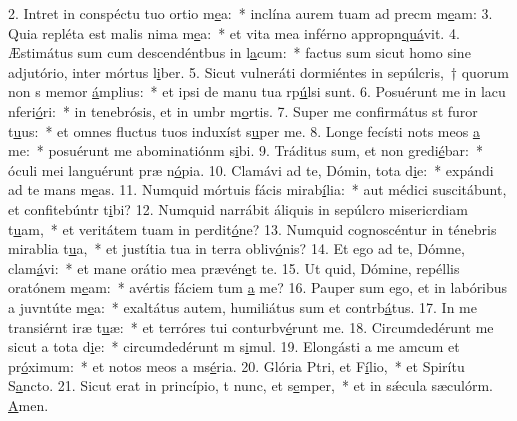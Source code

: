 2. Intret in conspéctu tuo ortio m\uline{e}a:~* inclína aurem tuam ad precm m\uline{e}am:
3. Quia repléta est malis nima m\uline{e}a:~* et vita mea inférno appropn\uline{quá}vit.
4. Æstimátus sum cum descendéntbus in l\uline{a}cum:~* factus sum sicut homo sine adjutório, inter mórtus l\uline{i}ber.
5. Sicut vulneráti dormiéntes in sepúlcris,~† quorum non s memor \uline{á}mplius:~* et ipsi de manu tua rp\uline{ú}lsi sunt.
6. Posuérunt me in lacu nferi\uline{ó}ri:~* in tenebrósis, et in umbr m\uline{o}rtis.
7. Super me confirmátus st furor t\uline{u}us:~* et omnes fluctus tuos induxíst s\uline{u}per me.
8. Longe fecísti nots meos \uline{a} me:~* posuérunt me abominatiónm s\uline{i}bi.
9. Tráditus sum, et non gredi\uline{é}bar:~* óculi mei languérunt præ n\uline{ó}pia.
10. Clamávi ad te, Dómin, tota d\uline{i}e:~* expándi ad te mans m\uline{e}as.
11. Numquid mórtuis fácis mirab\uline{í}lia:~* aut médici suscitábunt, et confitebúntr t\uline{i}bi?
12. Numquid narrábit áliquis in sepúlcro misericrdiam t\uline{u}am,~* et veritátem tuam in perdit\uline{ó}ne?
13. Numquid cognoscéntur in ténebris mirablia t\uline{u}a,~* et justítia tua in terra obliv\uline{ó}nis?
14. Et ego ad te, Dómne, clam\uline{á}vi:~* et mane orátio mea prævén\uline{e}t te.
15. Ut quid, Dómine, repéllis oratónem m\uline{e}am:~* avértis fáciem tum \uline{a} me?
16. Pauper sum ego, et in labóribus a juvntúte m\uline{e}a:~* exaltátus autem, humiliátus sum et contrb\uline{á}tus.
17. In me transiérnt iræ t\uline{u}æ:~* et terróres tui conturbv\uline{é}runt me.
18. Circumdedérunt me sicut a tota d\uline{i}e:~* circumdedérunt m s\uline{i}mul.
19. Elongásti a me amcum et pr\uline{ó}ximum:~* et notos meos a ms\uline{é}ria.
20. Glória Ptri, et F\uline{í}lio,~* et Spirítu S\uline{a}ncto.
21. Sicut erat in princípio, t nunc, et s\uline{e}mper,~* et in sǽcula sæculórm. \uline{A}men.
